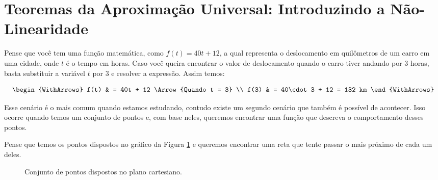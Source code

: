 \section{Teoremas da Aproximação Universal: Introduzindo a Não-Linearidade}

Pense que você tem uma função matemática, como $f(t) = 40t + 12$, a qual representa o deslocamento em quilômetros de um carro em uma cidade, onde $t$ é o tempo em horas. Caso você queira encontrar o valor de deslocamento quando o carro tiver andando por 3 horas, basta substituir a variável $t$ por 3 e resolver a expressão. Assim temos:

\[\begin{WithArrows}
    f(t) & = 40t + 12 \Arrow{Quando t = 3} \\
    f(3) & = 40\cdot 3 + 12 = 132 km
\end{WithArrows}\]

Esse cenário é o mais comum quando estamos estudando, contudo existe um segundo cenário que também é possível de acontecer. Isso ocorre quando temos um conjunto de pontos e, com base neles, queremos encontrar uma função que descreva o comportamento desses pontos.

Pense que temos os pontos dispostos no gráfico da Figura \ref{fig: pontos_addplot} e queremos encontrar uma reta que tente passar o mais próximo de cada um deles.

\begin{figure}[h!]
    \centering
    \caption{Conjunto de pontos dispostos no plano cartesiano.}
    \label{fig: pontos_addplot}
\end{figure}

